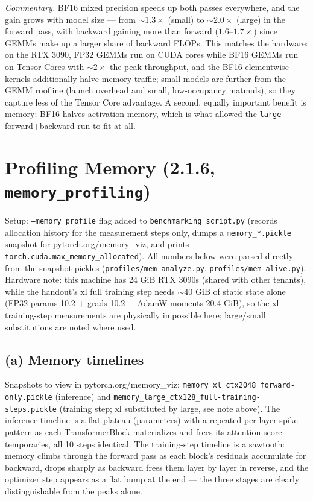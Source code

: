 \documentclass[11pt]{article}
\newcommand{\code}[1]{\texttt{#1}}
\begin{document}
\medskip
\noindent\emph{Commentary.} BF16 mixed precision speeds up both passes everywhere, and the gain grows
with model size --- from ${\sim}1.3\times$ (small) to ${\sim}2.0\times$ (large) in the forward pass,
with backward gaining more than forward ($1.6$--$1.7\times$) since GEMMs make up a larger share of
backward FLOPs. This matches the hardware: on the RTX 3090, FP32 GEMMs run on CUDA cores while BF16
GEMMs run on Tensor Cores with ${\sim}2\times$ the peak throughput, and the BF16 elementwise kernels
additionally halve memory traffic; small models are further from the GEMM roofline (launch overhead
and small, low-occupancy matmuls), so they capture less of the Tensor Core advantage. A second,
equally important benefit is memory: BF16 halves activation memory, which is what allowed the
\code{large} forward+backward run to fit at all.

\section{Profiling Memory (2.1.6, \texttt{memory\_profiling})}

Setup: \code{--memory\_profile} flag added to \code{benchmarking\_script.py} (records allocation
history for the measurement steps only, dumps a \code{memory\_*.pickle} snapshot for
pytorch.org/memory\_viz, and prints \code{torch.cuda.max\_memory\_allocated}). All numbers below were
parsed directly from the snapshot pickles (\code{profiles/mem\_analyze.py},
\code{profiles/mem\_alive.py}). Hardware note: this machine has 24 GiB RTX 3090s (shared with other
tenants), while the handout's xl full training step needs ${\sim}40$ GiB of static state alone (FP32
params 10.2 + grads 10.2 + AdamW moments 20.4 GiB), so the xl training-step measurements are
physically impossible here; large/small substitutions are noted where used.

\subsection{(a) Memory timelines}

Snapshots to view in pytorch.org/memory\_viz: \code{memory\_xl\_ctx2048\_forward-only.pickle}
(inference) and \code{memory\_large\_ctx128\_full-training-steps.pickle} (training step; xl
substituted by large, see note above). The inference timeline is a flat plateau (parameters) with a
repeated per-layer spike pattern as each TransformerBlock materializes and frees its attention-score
temporaries, all 10 steps identical. The training-step timeline is a sawtooth: memory climbs through
the forward pass as each block's residuals accumulate for backward, drops sharply as backward frees
them layer by layer in reverse, and the optimizer step appears as a flat bump at the end --- the
three stages are clearly distinguishable from the peaks alone.
\end{document}
